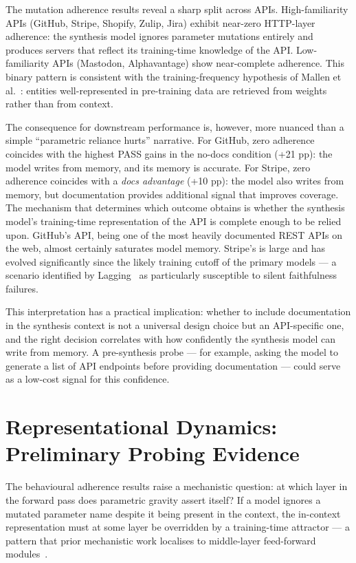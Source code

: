 \documentclass[12pt]{report}
\begin{document}
The mutation adherence results reveal a sharp split across APIs.
High-familiarity APIs (GitHub, Stripe, Shopify, Zulip, Jira) exhibit
near-zero HTTP-layer adherence: the synthesis model ignores parameter
mutations entirely and produces servers that reflect its training-time
knowledge of the API. Low-familiarity APIs (Mastodon, Alphavantage) show
near-complete adherence. This binary pattern is consistent with
the training-frequency hypothesis of Mallen et al.~\cite{mallen2023knowns}:
entities well-represented in pre-training data are retrieved from weights
rather than from context.

The consequence for downstream performance is, however, more nuanced than a
simple ``parametric reliance hurts'' narrative. For GitHub, zero adherence
coincides with the highest PASS gains in the no-docs condition (+21 pp): the
model writes from memory, and its memory is accurate. For Stripe, zero
adherence coincides with a \emph{docs advantage} (+10 pp): the model also
writes from memory, but documentation provides additional signal that
improves coverage. The mechanism that determines which outcome obtains is
whether the synthesis model's training-time representation of the API is
complete enough to be relied upon. GitHub's API, being one of the most
heavily documented REST APIs on the web, almost certainly saturates model
memory. Stripe's is large and has evolved significantly since the likely
training cutoff of the primary models --- a scenario identified by
Lagging~\cite{lagging2025} as particularly susceptible to silent
faithfulness failures.

This interpretation has a practical implication: whether to include
documentation in the synthesis context is not a universal design choice but
an API-specific one, and the right decision correlates with how confidently
the synthesis model can write from memory. A pre-synthesis probe --- for
example, asking the model to generate a list of API endpoints before
providing documentation --- could serve as a low-cost signal for this
confidence.

\section{Representational Dynamics: Preliminary Probing Evidence}

The behavioural adherence results raise a mechanistic question: at which
layer in the forward pass does parametric gravity assert itself? If a model
ignores a mutated parameter name despite it being present in the context,
the in-context representation must at some layer be overridden by a
training-time attractor --- a pattern that prior mechanistic work localises
to middle-layer feed-forward modules~\cite{meng2022rome,factualrecall2025}.
\end{document}

